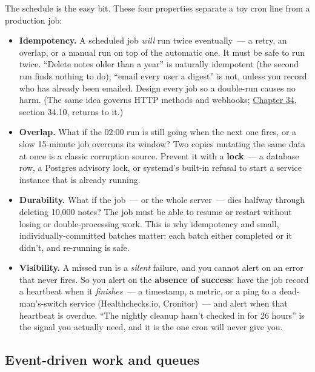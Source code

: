 The schedule is the easy bit. These four properties separate a toy cron line from a production job:

\begin{itemize}
\tightlist
\item
  \textbf{Idempotency.} A scheduled job \emph{will} run twice eventually~--- a retry, an overlap, or a manual run on top of the automatic one. It must be safe to run twice. ``Delete notes older than a year'' is naturally idempotent (the second run finds nothing to do); ``email every user a digest'' is not, unless you record who has already been emailed. Design every job so a double-run causes no harm. (The same idea governs HTTP methods and webhooks; \hyperref[ch:34-response-handling]{Chapter 34}, section 34.10, returns to it.)
\item
  \textbf{Overlap.} What if the 02:00 run is still going when the next one fires, or a slow 15-minute job overruns its window? Two copies mutating the same data at once is a classic corruption source. Prevent it with a \textbf{lock}~--- a database row, a Postgres advisory lock, or systemd's built-in refusal to start a service instance that is already running.
\item
  \textbf{Durability.} What if the job~--- or the whole server~--- dies halfway through deleting 10,000 notes? The job must be able to resume or restart without losing or double-processing work. This is why idempotency and small, individually-committed batches matter: each batch either completed or it didn't, and re-running is safe.
\item
  \textbf{Visibility.} A missed run is a \emph{silent} failure, and you cannot alert on an error that never fires. So you alert on the \textbf{absence of success}: have the job record a heartbeat when it \emph{finishes}~--- a timestamp, a metric, or a ping to a dead-man's-switch service (Healthchecks.io, Cronitor)~--- and alert when that heartbeat is overdue. ``The nightly cleanup hasn't checked in for 26 hours'' is the signal you actually need, and it is the one cron will never give you.
\end{itemize}

\subsection*{Event-driven work and queues}\label{25-process-management:event-driven-work-and-queues}

